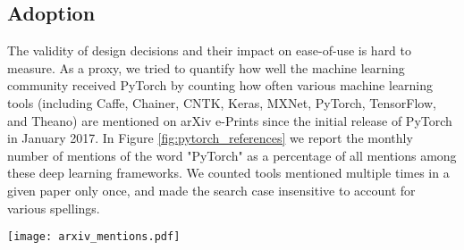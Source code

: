 \subsection{Adoption}
The validity of design decisions and their impact on ease-of-use is hard to measure. As a proxy, we tried to quantify how well the machine learning community received PyTorch by counting how often various machine learning tools (including Caffe, Chainer, CNTK, Keras, MXNet, PyTorch, TensorFlow, and Theano) are mentioned on arXiv e-Prints since the initial release of PyTorch in January 2017. In Figure \ref{fig:pytorch_references} we report the monthly number of mentions of the word "PyTorch" as a percentage of all mentions among these deep learning frameworks. We counted tools mentioned multiple times in a given paper only once, and made the search case insensitive to account for various spellings.

\begin{center}
  \texttt{[image: arxiv\_mentions.pdf]}
\end{center}
